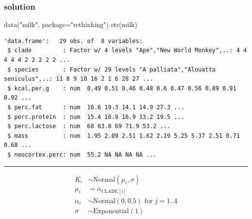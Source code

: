\documentclass[
  letterpaper,
  DIV=11,
  numbers=noendperiod]{scrartcl}
\newenvironment{Shaded}{\begin{snugshade}}{\end{snugshade}}
\newcommand{\AttributeTok}[1]{\textcolor[rgb]{0.40,0.45,0.13}{#1}}
\newcommand{\FunctionTok}[1]{\textcolor[rgb]{0.28,0.35,0.67}{#1}}
\newcommand{\NormalTok}[1]{\textcolor[rgb]{0.00,0.23,0.31}{#1}}
\newcommand{\OtherTok}[1]{\textcolor[rgb]{0.00,0.23,0.31}{#1}}
\newcommand{\SpecialCharTok}[1]{\textcolor[rgb]{0.37,0.37,0.37}{#1}}
\newcommand{\StringTok}[1]{\textcolor[rgb]{0.13,0.47,0.30}{#1}}
\begin{document}
\subsubsection{solution}\label{solution}

\begin{Shaded}
\begin{Highlighting}[]
\FunctionTok{data}\NormalTok{(}\StringTok{"milk"}\NormalTok{, }\AttributeTok{package=}\StringTok{"rethinking"}\NormalTok{)}
\FunctionTok{str}\NormalTok{(milk)}
\end{Highlighting}
\end{Shaded}

\begin{verbatim}
'data.frame':   29 obs. of  8 variables:
 $ clade         : Factor w/ 4 levels "Ape","New World Monkey",..: 4 4 4 4 4 2 2 2 2 2 ...
 $ species       : Factor w/ 29 levels "A palliata","Alouatta seniculus",..: 11 8 9 10 16 2 1 6 28 27 ...
 $ kcal.per.g    : num  0.49 0.51 0.46 0.48 0.6 0.47 0.56 0.89 0.91 0.92 ...
 $ perc.fat      : num  16.6 19.3 14.1 14.9 27.3 ...
 $ perc.protein  : num  15.4 16.9 16.9 13.2 19.5 ...
 $ perc.lactose  : num  68 63.8 69 71.9 53.2 ...
 $ mass          : num  1.95 2.09 2.51 1.62 2.19 5.25 5.37 2.51 0.71 0.68 ...
 $ neocortex.perc: num  55.2 NA NA NA NA ...
\end{verbatim}

\begin{Shaded}
\end{Shaded}

\begin{center}\rule{0.5\linewidth}{0.5pt}\end{center}

\begin{align*}
K_i &\sim \text{Normal}(\mu_i, \sigma) \\
\mu_i &= \alpha_{\text{CLADE}[i]} \\
\alpha_i &\sim \text{Normal}(0, 0.5) \text{ for }j=1..4 \\
\sigma &\sim \text{Exponential}(1) \\
\end{align*}
\end{document}
